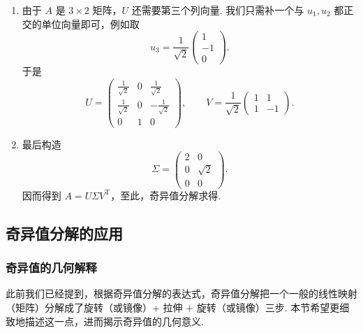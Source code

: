 \begin{solution}
\begin{enumerate}
        \item 由于 $A$ 是 $3 \times 2$ 矩阵，$U$ 还需要第三个列向量. 我们只需补一个与 $u_1, u_2$ 都正交的单位向量即可，例如取
              \[
                  u_3 = \frac{1}{\sqrt{2}}
                  \begin{pmatrix}
                      1  \\
                      -1 \\
                      0
                  \end{pmatrix}.
              \]
              于是
              \[
                  U =
                  \begin{pmatrix}
                      \frac{1}{\sqrt{2}} & 0 & \frac{1}{\sqrt{2}}  \\
                      \frac{1}{\sqrt{2}} & 0 & -\frac{1}{\sqrt{2}} \\
                      0                  & 1 & 0
                  \end{pmatrix},\qquad
                  V =
                  \frac{1}{\sqrt{2}}
                  \begin{pmatrix}
                      1 & 1  \\
                      1 & -1
                  \end{pmatrix}.
              \]

        \item 最后构造
              \[
                  \Sigma =
                  \begin{pmatrix}
                      2 & 0        \\
                      0 & \sqrt{2} \\
                      0 & 0
                  \end{pmatrix}.
              \]
              因而得到 $A = U\Sigma V^{\mathrm{T}}$，至此，奇异值分解求得.
    \end{enumerate}
\end{solution}

\subsection{奇异值分解的应用}

\subsubsection*{奇异值的几何解释}

此前我们已经提到，根据奇异值分解的表达式，奇异值分解把一个一般的线性映射（矩阵）分解成了旋转（或镜像）$+$ 拉伸 $+$ 旋转（或镜像）三步. 本节希望更细致地描述这一点，进而揭示奇异值的几何意义.


